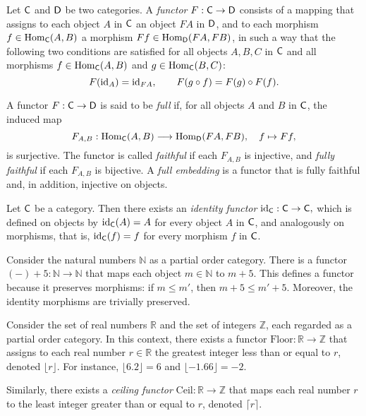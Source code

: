 \begin{definition}
  Let $\mathsf{C}$ and $\mathsf{D}$ be two categories. A \emph{functor} $F: \mathsf{C} \to \mathsf{D}$ consists of a mapping that assigns to each object $A$ in $\mathsf{C}$ an object $FA$ in $\mathsf{D}$, and to each morphism $f \in \mathrm{Hom}_{\mathsf{C}}(A, B)$ a morphism $Ff \in \mathrm{Hom}_{\mathsf{D}}(FA, FB)$, in such a way that the following two conditions are satisfied for all objects $A, B, C$ in $\mathsf{C}$ and all morphisms $f \in \mathrm{Hom}_{\mathsf{C}}(A,B)$ and $g \in \mathrm{Hom}_{\mathsf{C}}(B,C)$:
\[
F(\mathrm{id}_A) = \mathrm{id}_{FA}, \qquad F(g \circ f) = F(g) \circ F(f).
\]

A functor $F: \mathsf{C} \to \mathsf{D}$ is said to be \emph{full} if, for all objects $A$ and $B$ in $\mathsf{C}$, the induced map
\[
F_{A,B}: \mathrm{Hom}_{\mathsf{C}}(A, B) \longrightarrow \mathrm{Hom}_{\mathsf{D}}(FA, FB), \quad f \mapsto Ff,
\]
is surjective. The functor is called \emph{faithful} if each $F_{A,B}$ is injective, and \emph{fully faithful} if each $F_{A,B}$ is bijective. A \emph{full embedding} is a functor that is fully faithful and, in addition, injective on objects.
\end{definition}

\begin {example}
Let $\mathsf{C}$ be a category. Then there exists an \emph{identity functor} $\mathrm{id}_{\mathsf{C}} : \mathsf{C} \to \mathsf{C},$
which is defined on objects by $\mathrm{id}_{\mathsf{C}}(A) = A$ for every object $A$ in $\mathsf{C}$, and analogously on morphisms, that is, $\mathrm{id}_{\mathsf{C}}(f) = f$ for every morphism $f$ in $\mathsf{C}$.
\end{example}

\begin{example}
  Consider the natural numbers $\mathbb{N}$ as a partial order category. There is a functor $(-) + 5 : \mathbb{N} \to \mathbb{N}$
that maps each object $m \in \mathbb{N}$ to $m + 5$. This defines a functor because it preserves morphisms: if $m \leq m'$, then $m + 5 \leq m' + 5$. Moreover, the identity morphisms are trivially preserved.
\end{example}

\begin{example}
  Consider the set of real numbers $\mathbb{R}$ and the set of integers $\mathbb{Z}$, each regarded as a partial order category. In this context, there exists a functor $\mathrm{Floor} : \mathbb{R} \to \mathbb{Z} $ that assigns to each real number $r \in \mathbb{R}$ the greatest integer less than or equal to $r$, denoted $\lfloor r \rfloor$. For instance, $\lfloor 6.2 \rfloor = 6$ and $\lfloor -1.66 \rfloor = -2$. 

Similarly, there exists a \emph{ceiling functor} $\mathrm{Ceil} : \mathbb{R} \to \mathbb{Z}$ that maps each real number $r$ to the least integer greater than or equal to $r$, denoted $\lceil r \rceil$.
\end{example}


